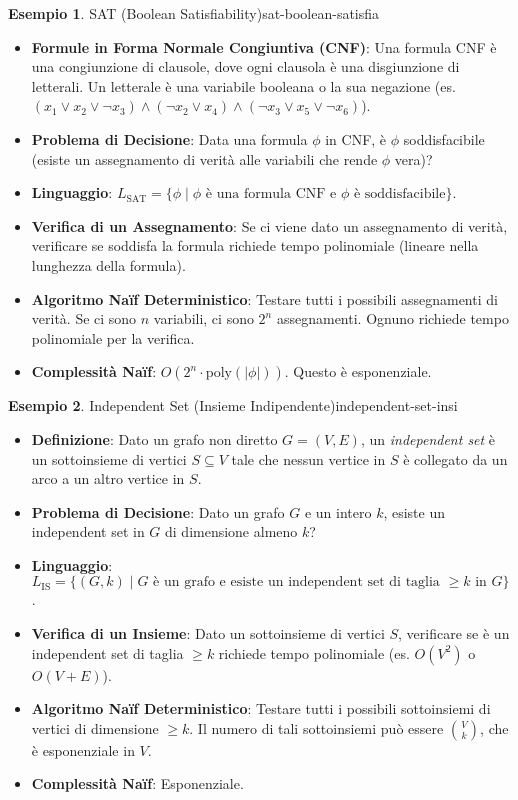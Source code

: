 \documentclass[a4paper]{article}
\theoremstyle{definition} %
\newtheorem{example}{Esempio}[section]
\begin{document}
\begin{example}{SAT (Boolean Satisfiability)}{sat-boolean-satisfia}
\begin{itemize}
    \item \textbf{Formule in Forma Normale Congiuntiva (CNF)}: Una formula CNF è una congiunzione di clausole, dove ogni clausola è una disgiunzione di letterali. Un letterale è una variabile booleana o la sua negazione (es. $(x_1 \lor x_2 \lor \neg x_3) \land (\neg x_2 \lor x_4) \land (\neg x_3 \lor x_5 \lor \neg x_6)$).
    \item \textbf{Problema di Decisione}: Data una formula $\phi$ in CNF, è $\phi$ soddisfacibile (esiste un assegnamento di verità alle variabili che rende $\phi$ vera)?
    \item \textbf{Linguaggio}: $L_{\text{SAT}} = \{ \phi \mid \phi \text{ è una formula CNF e } \phi \text{ è soddisfacibile} \}$.
    \item \textbf{Verifica di un Assegnamento}: Se ci viene dato un assegnamento di verità, verificare se soddisfa la formula richiede tempo polinomiale (lineare nella lunghezza della formula).
    \item \textbf{Algoritmo Naïf Deterministico}: Testare tutti i possibili assegnamenti di verità. Se ci sono $n$ variabili, ci sono $2^n$ assegnamenti. Ognuno richiede tempo polinomiale per la verifica.
    \item \textbf{Complessità Naïf}: $O(2^n \cdot \text{poly}(|\phi|))$. Questo è esponenziale.
\end{itemize}
\end{example}

\begin{example}{Independent Set (Insieme Indipendente)}{independent-set-insi}
\begin{itemize}
    \item \textbf{Definizione}: Dato un grafo non diretto $G=(V, E)$, un \emph{independent set} è un sottoinsieme di vertici $S \subseteq V$ tale che nessun vertice in $S$ è collegato da un arco a un altro vertice in $S$.
    \item \textbf{Problema di Decisione}: Dato un grafo $G$ e un intero $k$, esiste un independent set in $G$ di dimensione almeno $k$?
    \item \textbf{Linguaggio}: $L_{\text{IS}} = \{ (G, k) \mid G \text{ è un grafo e esiste un independent set di taglia } \ge k \text{ in } G \}$.
    \item \textbf{Verifica di un Insieme}: Dato un sottoinsieme di vertici $S$, verificare se è un independent set di taglia $\ge k$ richiede tempo polinomiale (es. $O(V^2)$ o $O(V+E)$).
    \item \textbf{Algoritmo Naïf Deterministico}: Testare tutti i possibili sottoinsiemi di vertici di dimensione $\ge k$. Il numero di tali sottoinsiemi può essere $\binom{V}{k}$, che è esponenziale in $V$.
    \item \textbf{Complessità Naïf}: Esponenziale.
\end{itemize}
\end{example}
\end{document}
